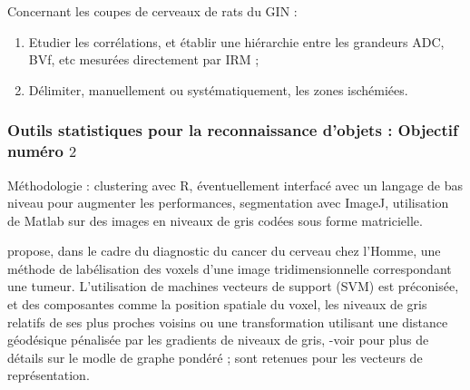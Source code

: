 Concernant les coupes de cerveaux de rats du GIN :

\begin{enumerate}[label=(Objectif\arabic*)]
\item Etudier les corr\'elations, et \'etablir une hi\'erarchie entre les grandeurs ADC, BVf, etc mesur\'ees directement par IRM ;
\item D\'elimiter, manuellement ou syst\'ematiquement, les zones isch\'emi\'ees.
\end{enumerate}

\subsubsection{Outils statistiques pour la reconnaissance d'objets : Objectif num\'ero $2$}

M\'ethodologie : clustering avec R, \'eventuellement interfac\'e avec un langage de bas niveau pour augmenter les performances, %
segmentation avec ImageJ, utilisation de Matlab sur des images en niveaux de gris cod\'ees sous forme matricielle.

\etoile
\cite{dol_cmi_16} propose, dans le cadre du diagnostic du cancer du cerveau chez l'Homme, une m\'ethode de lab\'elisation des voxels d'une image tridimensionnelle %
correspondant  une tumeur. %
L'utilisation de machines  vecteurs de support (SVM) est pr\'econis\'ee, et des composantes comme la position spatiale du voxel, %
les niveaux de gris relatifs de ses plus proches voisins ou une transformation utilisant une distance g\'eod\'esique p\'enalis\'ee par les gradients de niveaux de gris, %
-voir \cite{wei_geo_08} pour plus de d\'etails sur le modle de graphe pond\'er\'e ; sont retenues pour les vecteurs de repr\'esentation.

